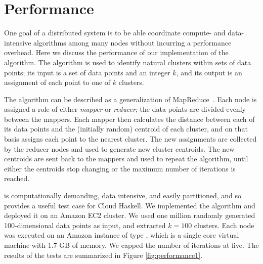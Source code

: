 \documentclass[preprint]{sigplanconf}
\begin{document}
\section{Performance}
\label{s:performance}

One goal of a distributed system is to be able coordinate compute- and data-intensive algorithms among many nodes without incurring a performance overhead. Here we discuss the performance of our implementation of the \kmeans{} algorithm. The algorithm is used to identify natural clusters within sets of data points; its input is a set of data points and an integer $k$, and its output is an assignment of each point to one of $k$ clusters.

The \kmeans{} algorithm can be described as a generalization of MapReduce~\cite{MapReduce2008}. Each node is assigned a role of either {\em mapper} or {\em reducer}; the data points are divided evenly between the mappers. Each mapper then calculates the distance between each of its data points and the (initially random) centroid of each cluster, and on that basis assigns each point to the nearest cluster. The new assignments are collected by the reducer nodes and used to generate new cluster centroids. The new centroids are sent back to the mappers and used to repeat the algorithm, until either the centroids stop changing or the maximum number of iterations is reached.

\kmeans{} is computationally demanding, data intensive, and easily partitioned, and so provides a useful test case for Cloud Haskell. We implemented the \kmeans{} algorithm and deployed it on an Amazon EC2 cluster. We used one million randomly generated 100-dimensional data points as input, and extracted $k=100$ clusters. Each node was executed on an Amazon instance of type , which is a single core virtual machine with 1.7 GB of memory. We capped the number of iterations at five. The results of the tests are summarized in Figure \ref{fig:performance1}.
\end{document}
